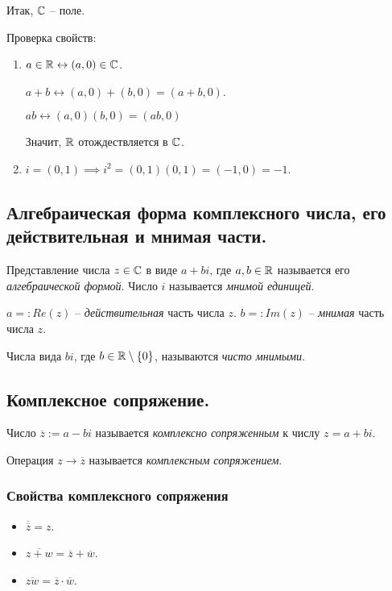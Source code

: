 Итак, $\mathbb{C}$ -- поле.

\bigskip
Проверка свойств:
\begin{enumerate}
\item $a \in \mathbb{R} \leftrightarrow (a, 0) \in \mathbb{C}$.

    $a + b \leftrightarrow (a, 0) + (b, 0) = (a + b, 0)$.

    $ab \leftrightarrow (a, 0)(b, 0) = (ab, 0)$

    Значит, $\mathbb{R}$ отождествляется в $\mathbb{C}$.

\item
    $i = (0, 1) \implies i^2 = (0, 1)(0, 1) = (-1, 0) = -1$.
\end{enumerate}


\subsection{Алгебраическая форма комплексного числа, его действительная и мнимая части.}

\begin{definition}
    Представление числа $z \in \mathbb{C}$ в виде $a + bi$, где $a, b \in \mathbb{R}$ называется его \textit{алгебраической формой}.
    Число $i$ называется \textit{мнимой единицей}.

    $a =: Re(z)$ -- \textit{действительная} часть числа $z$.
    $b =: Im(z)$ -- \textit{мнимая} часть числа $z$.
\end{definition}

Числа вида $bi$, где $b \in \mathbb{R} \setminus \{0\}$, называются \textit{чисто мнимыми}.

\subsection{Комплексное сопряжение.}

\begin{definition}
    Число $\overline{z} := a - bi$ называется \textit{комплексно сопряженным} к числу $z = a + bi$.

    Операция $z \to \overline{z}$ называется \textit{комплексным сопряжением}.
\end{definition}

\subsubsection{Свойства комплексного сопряжения}

\begin{itemize}[nosep]
\item $\overline{\overline{z}} = z$.
\item $\overline{z + w} = \overline{z} + \overline{w}$.
\item $\overline{zw} = \overline{z} \cdot \overline{w}$.
\end{itemize}


